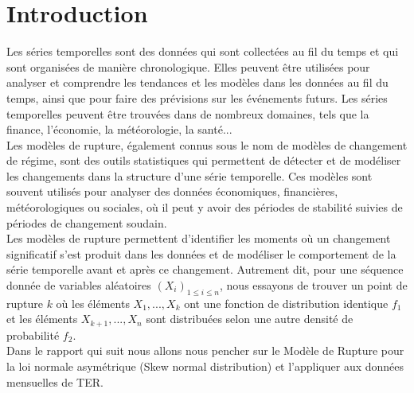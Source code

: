 \chapter*{Introduction}
\hspace{0.58cm}
Les séries temporelles sont des données qui sont collectées au fil du temps et qui sont
organisées de manière chronologique. Elles peuvent être utilisées pour analyser et comprendre les tendances et les modèles dans les données au fil du temps, ainsi que pour faire des prévisions sur les événements futurs. Les séries temporelles peuvent être trouvées dans de nombreux domaines, tels que la finance, l’économie, la météorologie, la santé...\\

Les modèles de rupture, également connus sous le nom de modèles de changement de régime, sont des outils statistiques qui permettent de détecter et de modéliser les changements dans la structure d’une série temporelle. Ces modèles sont souvent utilisés pour analyser des données économiques, financières, météorologiques ou sociales, où il peut y avoir des périodes de stabilité suivies de périodes de changement soudain.\\

Les modèles de rupture permettent d’identifier les moments où un changement significatif s’est produit dans les données et de modéliser le comportement de la série temporelle avant et après ce changement. Autrement dit, pour une séquence donnée de variables aléatoires $(X_i)_{1\leq i\leq n}$, nous essayons de trouver un point de rupture $k$ où les éléments $X_1, ..., X_k$ ont une fonction de distribution identique $f_1$ et les éléments $X_{k+1}, ..., X_n$ sont distribuées selon une autre densité de probabilité $f_2$.\\

Dans le rapport qui suit nous allons nous pencher sur le Modèle de Rupture pour la loi normale asymétrique (Skew normal distribution) et l’appliquer aux données mensuelles de TER.\\



